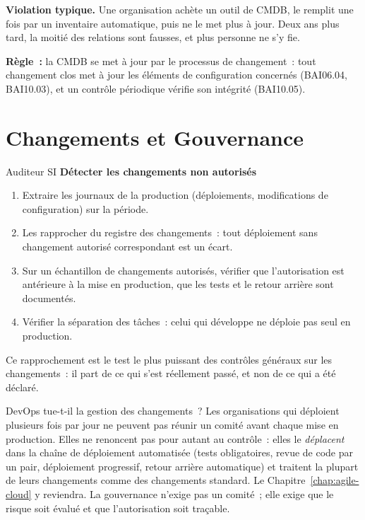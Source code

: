 \begin{boxalert}
\textbf{Violation typique.} Une organisation achète un outil de CMDB, le
remplit une fois par un inventaire automatique, puis ne le met plus à jour.
Deux ans plus tard, la moitié des relations sont fausses, et plus personne
ne s'y fie.

\smallskip
\textbf{Règle~:} la CMDB se met à jour par le processus de changement~:
tout changement clos met à jour les éléments de configuration concernés
(BAI06.04, BAI10.03), et un contrôle périodique vérifie son intégrité
(BAI10.05).
\end{boxalert}

\section{Changements et Gouvernance}
\label{sec:c14-gouvernance}

\begin{boxmetier}{Auditeur SI}
\textbf{Détecter les changements non autorisés}
\begin{enumerate}
    \item Extraire les journaux de la production (déploiements, modifications
          de configuration) sur la période.
    \item Les rapprocher du registre des changements~: tout déploiement
          sans changement autorisé correspondant est un écart.
    \item Sur un échantillon de changements autorisés, vérifier que
          l'autorisation est antérieure à la mise en production, que les
          tests et le retour arrière sont documentés.
    \item Vérifier la séparation des tâches~: celui qui développe ne
          déploie pas seul en production.
\end{enumerate}
Ce rapprochement est le test le plus puissant des contrôles généraux sur
les changements~: il part de ce qui s'est réellement passé, et non de ce
qui a été déclaré.
\end{boxmetier}

\begin{boiteRemarque}{DevOps tue-t-il la gestion des changements~?}
Les organisations qui déploient plusieurs fois par jour ne peuvent pas
réunir un comité avant chaque mise en production. Elles ne renoncent pas
pour autant au contrôle~: elles le \emph{déplacent} dans la chaîne de
déploiement automatisée (tests obligatoires, revue de code par un pair,
déploiement progressif, retour arrière automatique) et traitent la plupart
de leurs changements comme des changements standard. Le
Chapitre~\ref{chap:agile-cloud} y reviendra. La gouvernance n'exige pas un
comité~; elle exige que le risque soit évalué et que l'autorisation soit
traçable.
\end{boiteRemarque}

